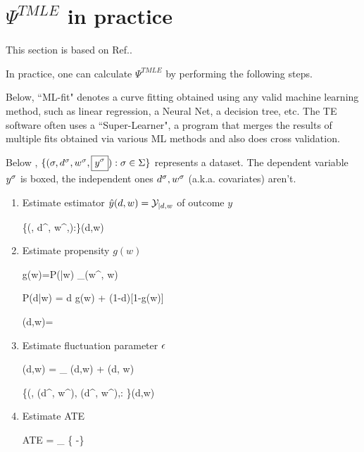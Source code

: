 \section{$\Psi^{TMLE}$ in practice}
This section is based on Ref.\cite{hoff}.

In practice, one can calculate $\Psi^{TMLE}$
by performing the following steps.

Below, ``ML-fit" denotes a curve fitting
obtained using any valid machine learning method,
such as linear regression, a Neural Net, a
decision tree, etc. The TE software
often uses a ``Super-Learner", a program that
 merges the results of multiple fits
obtained via various ML methods and also does cross validation.

Below , $\{(\sigma, d^\sigma, w^\sigma,\boxed{y^\sigma}):\sigma\in \Sigma\}$
represents a dataset. The dependent variable $y^\sigma$ is boxed,
the independent ones $d^\sigma,w^\sigma$ (a.k.a. covariates) aren't.

\begin{enumerate}
\item Estimate estimator ${\hat{y}}(d,w)={\cal Y}_{|d,w}$ of outcome $y$

\beq
\{(\s, d^\s, w^\s,):\s\in \Sigma\}\mlarr \haty(d,w)
\eeq

\item Estimate propensity $g(w)$

\beq
g(w)=P(|w)\approx
{}
{\sum_\s \delta(w^\s, w)}
\eeq

\beq
P(d|w) = d g(w) + (1-d)[1-g(w)]
\eeq

\beq
\beta(d,w)=
\eeq

\item Estimate fluctuation parameter $\epsilon$

\beq
\eta(d,w) =
\underbrace{\logit[\haty(d, w)]}_
{\xi(d,w)}
 + \eps \beta(d, w)
\eeq

\beq
\{(\s, \xi(d^\s, w^\s),
\beta(d^\s, w^\s),:
\s\in \Sigma\}\mlarr \hat{\eta}(d,w)
\eeq

\item Estimate ATE

\beq
ATE =  \sum_\s
\left\{
 \expit[ \hat{\eta}(d=1,w^\s)]
 -\expit[ \hat{\eta}(d=0,w^\s)]
 \right\}
\eeq

\end{enumerate}
